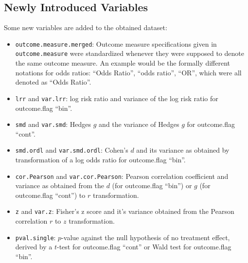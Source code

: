 \documentclass[11pt,a4paper,twoside]{book}\usepackage[]{graphicx}\usepackage[]{color}
\begin{document}
\subsection{Newly Introduced Variables}
Some new variables are added to the obtained dataset:
\begin{itemize}
\item \texttt{outcome.measure.merged}: Outcome measure specifications given in \texttt{outcome.measure} were standardized whenever they were supposed to denote the same outcome measure. An example would be the formally different notations for odds ratios: ``Odds Ratio'', ``odds ratio'', ``OR'', which were all denoted as ``Odds Ratio''.
\item \texttt{lrr} and \texttt{var.lrr}: log risk ratio and variance of the log risk ratio for outcome.flag ``bin''.
\item \texttt{smd} and \texttt{var.smd}: Hedges $g$ and the variance of Hedges $g$ for outcome.flag ``cont''. 
\item \texttt{smd.ordl} and \texttt{var.smd.ordl}: Cohen's $d$ and its variance as obtained by transformation of a log odds ratio for outcome.flag ``bin''.
\item \texttt{cor.Pearson} and \texttt{var.cor.Pearson}: Pearson correlation coefficient and variance as obtained from the $d$ (for outcome.flag ``bin'') or $g$ (for outcome.flag ``cont'') to $r$ transformation.
\item \texttt{z} and \texttt{var.z}: Fisher's z score and it's variance obtained from the Pearson correlation $r$ to $z$ transformation.
\item \texttt{pval.single}: $p$-value against the null hypothesis of no treatment effect, derived by a $t$-test for outcome.flag ``cont'' or Wald test for outcome.flag ``bin''.

\end{itemize}
\end{document}
